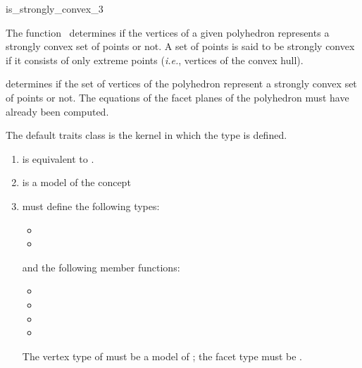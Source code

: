 \begin{ccRefFunction}{is_strongly_convex_3}

\ccDefinition

The function \ccRefName\ determines if the vertices of a given polyhedron 
represents a strongly convex set of points or not.  A set of points is said 
to be strongly convex if it consists of only extreme points (\textit{i.e.}, 
vertices of the convex hull).


{
determines if the set of vertices of the polyhedron  represent
a strongly convex set of points or not.
\ccPrecond%
The equations of the facet planes of the polyhedron must have
already been computed.
}

The default traits class is the kernel in which the type 
 is defined.

\begin{enumerate}
   \item {} is equivalent to .
   \item {} is a model of the concept 
  \item {} must define the following types:
        \begin{itemize}
          \item {}
          \item {}
        \end{itemize}
        and the following member functions:
        \begin{itemize}
          \item {}
          \item {}
          \item {}
          \item {}
        \end{itemize}
        The vertex type of  must be a model of
        ;
        the facet type must be .
\end{enumerate}



\end{ccRefFunction}
